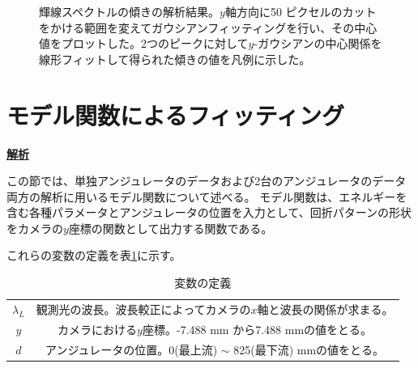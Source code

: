 \documentclass[a4paper,11pt,uplatex]{jsbook}
\begin{document}
\begin{figure}[H]
\begin{subfigure}[h]{0.45\linewidth}
  \end{subfigure}
  \caption[水銀灯の波長較正-3]{輝線スペクトルの傾きの解析結果。$y$軸方向に50 ピクセルのカットをかける範囲を変えてガウシアンフィッティングを行い、その中心値をプロットした。2つのピークに対して$y$-ガウシアンの中心関係を線形フィットして得られた傾きの値を凡例に示した。}\label{tiltfit}
\end{figure}

\section{モデル関数によるフィッティング}
\noindent \textbf{\underline{解析}}\par
この節では、単独アンジュレータのデータおよび2台のアンジュレータのデータ両方の解析に用いるモデル関数について述べる。
モデル関数は、エネルギーを含む各種パラメータとアンジュレータの位置を入力として、回折パターンの形状をカメラの$y$座標の関数として出力する関数である。


これらの変数の定義を表\ref{tab:variables}に示す。
\begin{table}[h]
  \centering
  \begin{tabular}{c|c}
    $\lambda_L$ & 観測光の波長。波長較正によってカメラの$x$軸と波長の関係が求まる。\\
    $y$ & カメラにおける$y$座標。-7.488 mm から7.488 mmの値をとる。\\
    $d$ & アンジュレータの位置。0(最上流) $\sim$ 825(最下流) mmの値をとる。\\
  \end{tabular}
  \caption[変数の定義]{変数の定義}\label{tab:variables}
\end{table}
\end{document}
